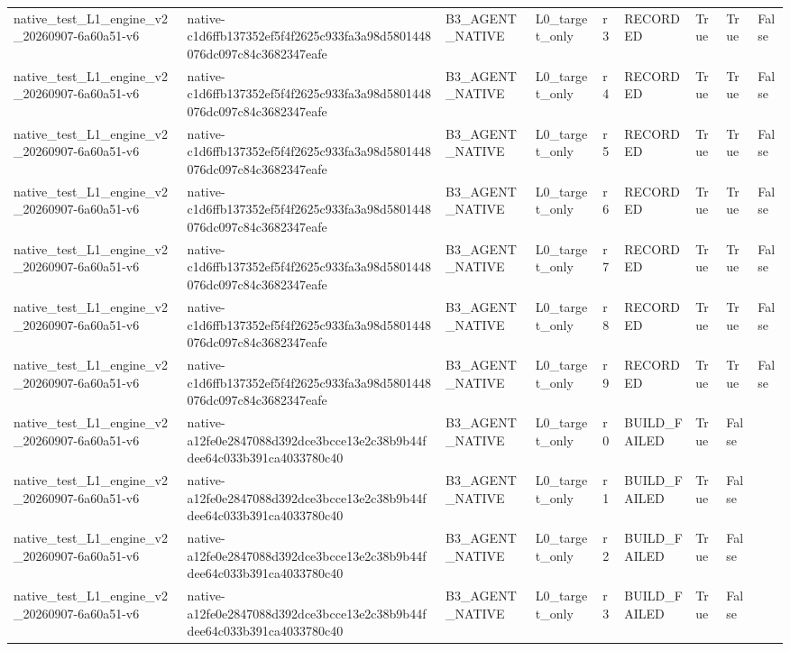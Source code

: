 \begin{tabular}{lllllllll}
native\_test\_L1\_engine\_v2\_20260907-6a60a51-v6 & native-c1d6ffb137352ef5f4f2625c933fa3a98d5801448076dc097c84c3682347eafe & B3\_AGENT\_NATIVE & L0\_target\_only & r3 & RECORDED & True & True & False \\
native\_test\_L1\_engine\_v2\_20260907-6a60a51-v6 & native-c1d6ffb137352ef5f4f2625c933fa3a98d5801448076dc097c84c3682347eafe & B3\_AGENT\_NATIVE & L0\_target\_only & r4 & RECORDED & True & True & False \\
native\_test\_L1\_engine\_v2\_20260907-6a60a51-v6 & native-c1d6ffb137352ef5f4f2625c933fa3a98d5801448076dc097c84c3682347eafe & B3\_AGENT\_NATIVE & L0\_target\_only & r5 & RECORDED & True & True & False \\
native\_test\_L1\_engine\_v2\_20260907-6a60a51-v6 & native-c1d6ffb137352ef5f4f2625c933fa3a98d5801448076dc097c84c3682347eafe & B3\_AGENT\_NATIVE & L0\_target\_only & r6 & RECORDED & True & True & False \\
native\_test\_L1\_engine\_v2\_20260907-6a60a51-v6 & native-c1d6ffb137352ef5f4f2625c933fa3a98d5801448076dc097c84c3682347eafe & B3\_AGENT\_NATIVE & L0\_target\_only & r7 & RECORDED & True & True & False \\
native\_test\_L1\_engine\_v2\_20260907-6a60a51-v6 & native-c1d6ffb137352ef5f4f2625c933fa3a98d5801448076dc097c84c3682347eafe & B3\_AGENT\_NATIVE & L0\_target\_only & r8 & RECORDED & True & True & False \\
native\_test\_L1\_engine\_v2\_20260907-6a60a51-v6 & native-c1d6ffb137352ef5f4f2625c933fa3a98d5801448076dc097c84c3682347eafe & B3\_AGENT\_NATIVE & L0\_target\_only & r9 & RECORDED & True & True & False \\
native\_test\_L1\_engine\_v2\_20260907-6a60a51-v6 & native-a12fe0e2847088d392dce3bcce13e2c38b9b44fdee64c033b391ca4033780c40 & B3\_AGENT\_NATIVE & L0\_target\_only & r0 & BUILD\_FAILED & True & False &  \\
native\_test\_L1\_engine\_v2\_20260907-6a60a51-v6 & native-a12fe0e2847088d392dce3bcce13e2c38b9b44fdee64c033b391ca4033780c40 & B3\_AGENT\_NATIVE & L0\_target\_only & r1 & BUILD\_FAILED & True & False &  \\
native\_test\_L1\_engine\_v2\_20260907-6a60a51-v6 & native-a12fe0e2847088d392dce3bcce13e2c38b9b44fdee64c033b391ca4033780c40 & B3\_AGENT\_NATIVE & L0\_target\_only & r2 & BUILD\_FAILED & True & False &  \\
native\_test\_L1\_engine\_v2\_20260907-6a60a51-v6 & native-a12fe0e2847088d392dce3bcce13e2c38b9b44fdee64c033b391ca4033780c40 & B3\_AGENT\_NATIVE & L0\_target\_only & r3 & BUILD\_FAILED & True & False &  \\

\end{tabular}
